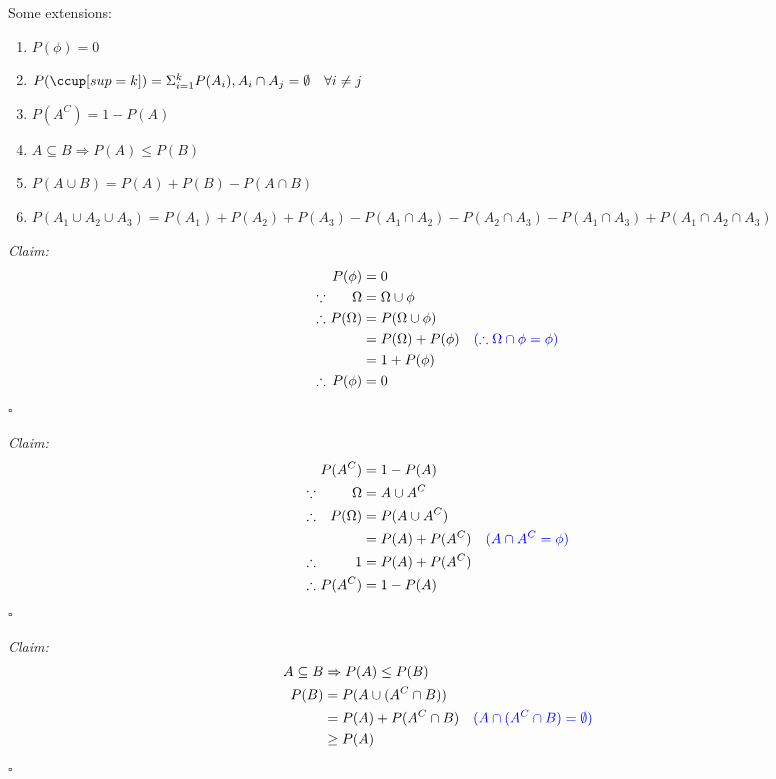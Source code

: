 \documentclass[12pt]{article}
\newcommand{\mathcomment}[0]{\quad\color{blue}}
\newenvironment{claim}{\textit{Claim:}}{\hfill $\square$}
\begin{document}
Some extensions:

\begin{enumerate}
	\item \(P(\phi) = 0\)
	\item \(P(\ccup[sup=k]) = \Sigma_{i=1}^{k} P(A_i), A_i \cap A_j = \emptyset \quad \forall i \ne j\)
	\item \(P(A^C) = 1 - P(A)\)
	\item \(A \subseteq B \Rightarrow P(A) \le P(B)\)
	\item \(P(A \cup B) = P(A) + P(B) - P(A \cap B)\)
	\item \(P(A_1 \cup A_2 \cup A_3) = P(A_1) + P(A_2) + P(A_3) - P(A_1 \cap A_2) - P(A_2 \cap A_3) - P(A_1 \cap A_3) + P(A_1 \cap A_2 \cap A_3)\)
\end{enumerate}

\begin{claim}
\begin{equation}
	\begin{alignedat}{3}
		&& P(\phi) &= 0 &\\
		\because \ && \Omega & = \Omega \cup \phi &\\
		\therefore \ && P(\Omega) & = P(\Omega \cup \phi) &\\
		&& & = P(\Omega) + P(\phi) & \mathcomment (\therefore \Omega \cap \phi = \phi) \\
		&& & = 1+ P(\phi) &\\
		\therefore \ && P(\phi) &= 0 &
	\end{alignedat}
\end{equation}
\end{claim}

\begin{claim}
	\begin{equation}
		\begin{alignedat}{3}
		&& P(A^C) &= 1 - P(A) &\\
		\because \ && \Omega & = A \cup A^C &\\
		\therefore \ && P(\Omega) &= P(A \cup A^C) &\\
		&& &	= P(A) + P(A^C) & \mathcomment (A \cap A^C = \phi) \\
		\therefore \ && 1 &= P(A) + P(A^C) &\\
		\therefore \ && P(A^C) &= 1 - P(A) &
		\end{alignedat}
	\end{equation}
\end{claim}

\begin{claim}
	\begin{equation}
		\begin{alignedat}{2}
			A \subseteq B & \Rightarrow P(A) \le P(B) &\\
			P(B) & = P(A \cup (A^C \cap B)) &\\
			& = P(A) + P(A^C \cap B) & \mathcomment (A \cap (A^C \cap B) = \emptyset) \\
			& \ge P(A) &
		\end{alignedat}
	\end{equation}
\end{claim}
\end{document}
